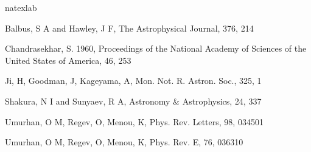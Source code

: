 \documentclass{emulateapj}
\begin{document}
%
%



\begin{thebibliography}{53}
\expandafter\ifx\csname natexlab\endcsname\relax\def\natexlab#1{#1}\fi

Balbus, S A and Hawley, J F, The Astrophysical Journal, 376, 214

Chandrasekhar, S. 1960, Proceedings of the National Academy of Sciences of the United States of America, 46, 253

Ji, H, Goodman, J, Kageyama, A, Mon. Not. R. Astron. Soc., 325, 1

Shakura, N I and Sunyaev, R A, Astronomy \& Astrophysics, 24, 337

Umurhan, O M, Regev, O, Menou, K, Phys. Rev. Letters, 98, 034501

Umurhan, O M, Regev, O, Menou, K, Phys. Rev. E, 76, 036310


\end{thebibliography}
\end{document}
